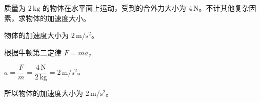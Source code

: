 
\begin{problem}
质量为 $2\,\mathrm{kg}$ 的物体在水平面上运动，受到的合外力大小为 $4\,\mathrm{N}$。不计其他复杂因素，求物体的加速度大小。
\end{problem}

\begin{answer}
物体的加速度大小为 $2\,\mathrm{m/s^2}$。
\end{answer}

\begin{solutions}
根据牛顿第二定律 $F=ma$，

$a=\dfrac{F}{m}=\dfrac{4\,\mathrm{N}}{2\,\mathrm{kg}}=2\,\mathrm{m/s^2}$。

所以物体的加速度大小为 $2\,\mathrm{m/s^2}$。
\end{solutions}
